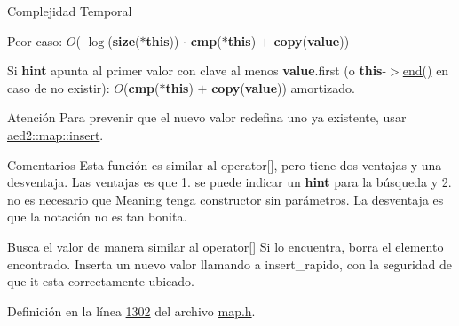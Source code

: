 \begin{DoxyDescription}
\item[Complejidad Temporal]
\begin{DoxyItemize}
\item Peor caso\+: $O$( $\log$({\bfseries size}({\bfseries $\ast$this})) $\cdot$ {\bfseries cmp}({\bfseries $\ast$this}) $+$ {\bfseries copy}({\bfseries value}))
\item Si {\bfseries hint} apunta al primer valor con clave al menos {\bfseries value}.first (o {\bfseries this}-\/$>$\hyperlink{classaed2_1_1map_a76023e6a56cb625513e1b5ea028bf983_a76023e6a56cb625513e1b5ea028bf983}{end()} en caso de no existir)\+: $O$({\bfseries cmp}({\bfseries $\ast$this}) $+$ {\bfseries copy}({\bfseries value})) amortizado. 
\end{DoxyItemize}
\end{DoxyDescription}

\begin{DoxyAttention}{Atención}
Para prevenir que el nuevo valor redefina uno ya existente, usar \hyperlink{classaed2_1_1map_a60aacba06b1579630b3c8e996cf248c8_a60aacba06b1579630b3c8e996cf248c8}{aed2\+::map\+::insert}. 
\end{DoxyAttention}
\begin{DoxyRemark}{Comentarios}
Esta función es similar al operator\mbox{[}\mbox{]}, pero tiene dos ventajas y una desventaja. Las ventajas es que 1. se puede indicar un {\bfseries hint} para la búsqueda y 2. no es necesario que Meaning tenga constructor sin parámetros. La desventaja es que la notación no es tan bonita.
\end{DoxyRemark}
Busca el valor de manera similar al operator\mbox{[}\mbox{]} Si lo encuentra, borra el elemento encontrado. Inserta un nuevo valor llamando a insert\+\_\+rapido, con la seguridad de que it esta correctamente ubicado. 

Definición en la línea \hyperlink{map_8h_source_l01302}{1302} del archivo \hyperlink{map_8h_source}{map.\+h}.

\mbox{\label{classaed2_1_1map_a9128a806713bcc999ebd8a97ab77e765_a9128a806713bcc999ebd8a97ab77e765}} 
